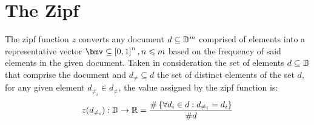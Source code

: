 \documentclass[\main/main.tex]{subfiles}
\begin{document}
\chapter{The Zipf}
The zipf function \(z\) converts any document \(d \subseteq \mathbb{D}^m \) comprised of elements into a representative vector \(\bmv \subseteq \sqr{0, 1}^n, n \leq m \) based on the frequency of said elements in the given document. Taken in consideration the set of elements \(d \subseteq \mathbb{D} \) that comprise the document and \(d_{\neq} \subseteq d\) the set of distinct elements of the set \(d\), for any given element \(d_{\neq_{i}} \in d_{\neq}\), the value assigned by the zipf function is:
\[
  z(d_{\neq_{i}}):\mathbb{D} \rightarrow \mathbb{R}  = \frac{\#\left\{\forall d_i \in d: d_{\neq_{i}}=d_i\right\}}{\#d}
\]
\end{document}
